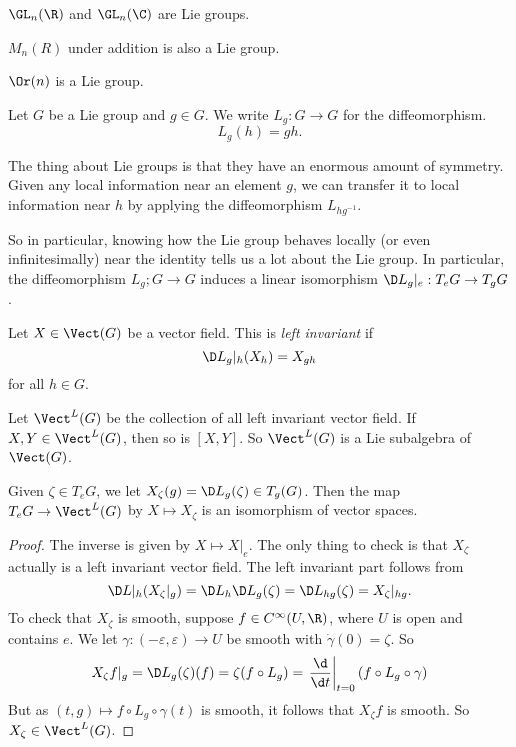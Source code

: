 \documentclass[a4paper]{article}
\begin{document}
\begin{eg}
  $\GL_n(\R)$ and $\GL_n(\C)$ are Lie groups.
\end{eg}

\begin{eg}
  $M_n(R)$ under addition is also a Lie group.
\end{eg}

\begin{eg}
  $\Or(n)$ is a Lie group.
\end{eg}

\begin{notation}
  Let $G$ be a Lie group and $g \in G$. We write $L_g: G \to G$ for the diffeomorphism.
  \[
    L_g(h) = gh.
  \]
\end{notation}
The thing about Lie groups is that they have an enormous amount of symmetry. Given any local information near an element $g$, we can transfer it to local information near $h$ by applying the diffeomorphism $L_{hg^{-1}}$.

So in particular, knowing how the Lie group behaves locally (or even infinitesimally) near the identity tells us a lot about the Lie group. In particular, the diffeomorphism $L_g; G \to G$ induces a linear isomorphism $\D L_g|_e : T_e G \to T_g G$.

\begin{defi}
  Let $X \in \Vect(G)$ be a vector field. This is \emph{left invariant} if
  \[
    \D L_g|_h (X_h) = X_{gh}
  \]
  for all $h \in G$.
\end{defi}

Let $\Vect^L(G)$ be the collection of all left invariant vector field. If $X, Y \in \Vect^L(G)$, then so is $[X, Y]$. So $\Vect^L(G)$ is a Lie subalgebra of $\Vect(G)$.

\begin{lemma}
  Given $\zeta \in T_e G$, we let $X_\zeta(g) = \D L_g(\zeta) \in T_g(G)$. Then the map $T_e G \to \Vect^L(G)$ by $X \mapsto X_\zeta$ is an isomorphism of vector spaces.
\end{lemma}

\begin{proof}
  The inverse is given by $X \mapsto X|_e$. The only thing to check is that $X_\zeta$ actually is a left invariant vector field. The left invariant part follows from
  \[
    \D L|_h (X_\zeta|_g) = \D L_h \D L_g (\zeta) = \D L_{hg}(\zeta) = X_\zeta |_{hg}.
  \]
  To check that $X_\zeta$ is smooth, suppose $f \in C^\infty(U, \R)$, where $U$ is open and contains $e$. We let $\gamma: (-\varepsilon, \varepsilon) \to U$ be smooth with $\dot{\gamma}(0) = \zeta$. So
  \[
    X_\zeta f|_g = \D L_g (\zeta)(f) = \zeta(f \circ L_g) = \left.\frac{\d}{\d t}\right|_{t = 0} (f \circ L_g \circ \gamma)
  \]
  But as $(t, g) \mapsto f \circ L_g \circ \gamma(t)$ is smooth, it follows that $X_\zeta f$ is smooth. So $X_\zeta \in \Vect^L(G)$.
\end{proof}
\end{document}
